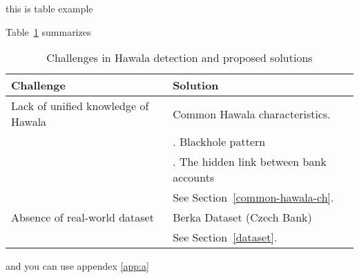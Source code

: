this is table example

Table~\ref{tab:hawala-challenges} summarizes ~~

\begin{table}[htbp]
	\begin{tabular}{p{5cm}|p{7cm}}
		\hline
		\cellcolor{Gray}Challenge                                                  & \cellcolor{Gray}Solution  \\ \hline
		Lack of unified knowledge of Hawala & Common Hawala characteristics. \\
            & \MakeUppercase{\romannumeral 1}. Blackhole pattern \\
            & \MakeUppercase{\romannumeral 2}. The hidden link between bank accounts \\ 
            & See Section~\ref{common-hawala-ch}. \\ \hline
            Absence of real-world dataset & Berka Dataset (Czech Bank) \cite{berka} \\
            & See Section~\ref{dataset}. \\ \hline
	\end{tabular}
	\caption{Challenges in Hawala detection and proposed solutions \label{tab:hawala-challenges}}
\end{table}

and you can use appendex \ref{app:a}
